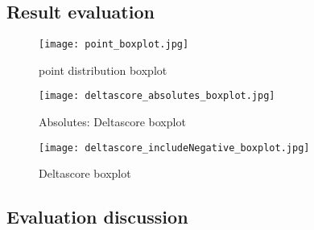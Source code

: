 \newpage
\subsection{Result evaluation} \label{resulteval}


\begin{figure}[h!]
\centering
\texttt{[image: point\_boxplot.jpg]}
\caption{point distribution boxplot}
\label{fig:boxplot_points}
\end{figure}


\begin{figure}[h!]
\centering
\texttt{[image: deltascore\_absolutes\_boxplot.jpg]}
\caption{Absolutes: Deltascore boxplot}
\label{fig:question5}
\end{figure}
\begin{figure}[h!]
\centering
\texttt{[image: deltascore\_includeNegative\_boxplot.jpg]}
\caption{Deltascore boxplot}
\label{fig:question5}
\end{figure}


\subsection{Evaluation discussion}
